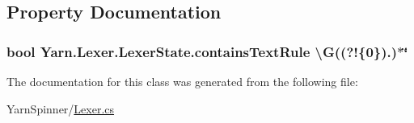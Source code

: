 \subsection{Property Documentation}
\hypertarget{a00062_a69948f05c35eeae9cb8448c849a053e6}{
\subsubsection[{contains\-Text\-Rule}]{\setlength{\rightskip}{0pt plus 5cm}bool Yarn.\-Lexer.\-Lexer\-State.\-contains\-Text\-Rule \textbackslash{}G((?!\{0\}).)$\ast$\char`\"{}\hspace{0.3cm}{\ttfamily [get]}}}\label{a00062_a69948f05c35eeae9cb8448c849a053e6}


The documentation for this class was generated from the following file\-:\begin{DoxyCompactItemize}
\item 
Yarn\-Spinner/\hyperlink{a00140}{Lexer.\-cs}\end{DoxyCompactItemize}

